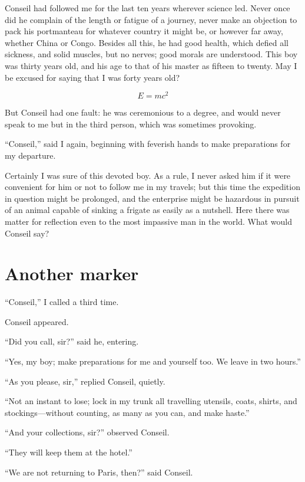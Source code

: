 Conseil had followed me for the last ten years wherever science led.
Never once did he complain of the length or fatigue of a journey,
never make an objection to pack his portmanteau for whatever
country it might be, or however far away, whether China or Congo.
Besides all this, he had good health, which defied all sickness,
and solid muscles, but no nerves; good morals are understood.
This boy was thirty years old, and his age to that of his master
as fifteen to twenty.  May I be excused for saying that I was
forty years old?

\begin{equation}
E=mc^2
\end{equation}

But Conseil had one fault:  he was ceremonious to a degree,
and would never speak to me but in the third person,
which was sometimes provoking.

``Conseil,'' said I again, beginning with feverish hands to make
preparations for my departure.

Certainly I was sure of this devoted boy.  As a rule, I never asked
him if it were convenient for him or not to follow me in my travels;
but this time the expedition in question might be prolonged,
and the enterprise might be hazardous in pursuit of an animal capable
of sinking a frigate as easily as a nutshell.  Here there was matter
for reflection even to the most impassive man in the world.
What would Conseil say?

\section{Another marker}

``Conseil,'' I called a third time.

Conseil appeared.

``Did you call, sir?'' said he, entering.

``Yes, my boy; make preparations for me and yourself too.
We leave in two hours.''

``As you please, sir,'' replied Conseil, quietly.

``Not an instant to lose; lock in my trunk all travelling utensils,
coats, shirts, and stockings---without counting, as many as you can,
and make haste.''

``And your collections, sir?'' observed Conseil.

``They will keep them at the hotel.''

``We are not returning to Paris, then?'' said Conseil.

